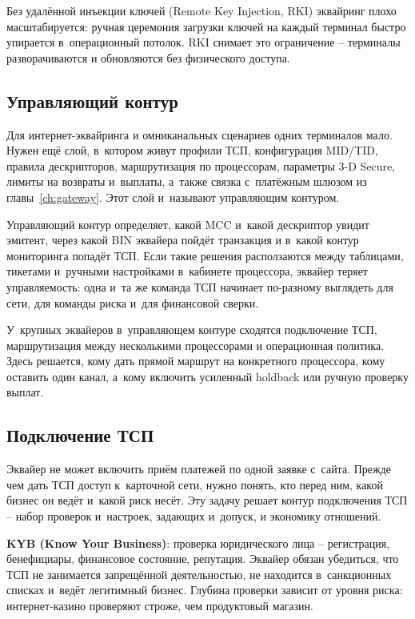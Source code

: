 Без удалённой инъекции ключей (Remote Key Injection, RKI) эквайринг
плохо масштабируется: ручная церемония загрузки ключей на каждый
терминал быстро упирается в~операционный потолок. RKI снимает это
ограничение -- терминалы разворачиваются и обновляются без физического
доступа.~\cite{visa-tpa-registration-program-faqs}

\subsection*{Управляющий контур}

Для интернет-эквайринга и омниканальных сценариев одних терминалов
мало. Нужен ещё слой, в~котором живут профили ТСП, конфигурация
MID/TID, правила дескрипторов, маршрутизация по процессорам,
параметры 3-D Secure, лимиты на возвраты и~выплаты, а~также связка
с~платёжным шлюзом из главы~\ref{ch:gateway}. Этот слой и~называют
управляющим контуром.

Управляющий контур определяет, какой MCC и~какой дескриптор увидит
эмитент, через какой BIN эквайера пойдёт транзакция и в~какой контур
мониторинга попадёт ТСП. Если такие решения расползаются между
таблицами, тикетами и~ручными настройками в~кабинете процессора,
эквайер теряет управляемость: одна и~та же команда ТСП начинает
по-разному выглядеть для сети, для команды риска и~для финансовой
сверки.~\cite{visa-merchant-data-standards-manual}

У~крупных эквайеров в~управляющем контуре сходятся подключение ТСП,
маршрутизация между несколькими процессорами и операционная политика.
Здесь решается, кому дать прямой маршрут на конкретного процессора,
кому оставить один канал, а~кому включить усиленный holdback или
ручную проверку выплат.

\subsection*{Подключение ТСП}

Эквайер не может включить приём платежей по одной заявке с~сайта.
Прежде чем дать ТСП доступ к~карточной сети, нужно понять, кто
перед ним, какой бизнес он ведёт и~какой риск несёт. Эту задачу
решает контур подключения ТСП -- набор проверок и~настроек,
задающих и~допуск, и экономику отношений.

\textbf{KYB (Know Your Business)}: проверка юридического лица --
регистрация, бенефициары, финансовое состояние, репутация. Эквайер
обязан убедиться, что ТСП не занимается запрещённой деятельностью,
не находится в~санкционных списках и~ведёт легитимный бизнес.
Глубина проверки зависит от уровня риска: интернет-казино проверяют
строже, чем продуктовый магазин.

